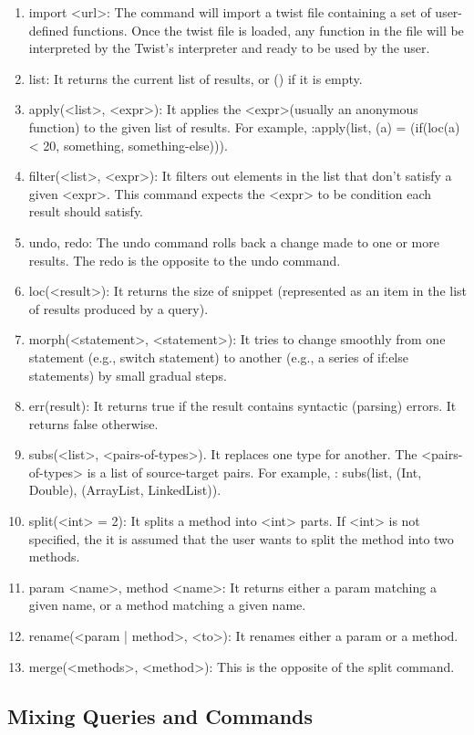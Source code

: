 \begin{enumerate}
	\item import <url>: The command will import a twist file containing a set of 
	user-defined functions. Once the twist file is loaded, any function in the file will 
	be interpreted by the Twist's interpreter and ready to be used by the user.
	\item list: It returns the current list of results, or () if it is empty.
	\item apply(<list>, <expr>): It applies the <expr>(usually an anonymous function) 
	to the given list of results. For example, :apply(list, (a) = (if(loc(a) < 20, 
	something, something-else))).
	\item filter(<list>, <expr>): It filters out elements in the list that don't satisfy 
	a given <expr>. This command expects the <expr> to be condition each result should 
	satisfy.
	\item undo, redo: The undo command rolls back a change made to one or more results. 
	The redo is the opposite to the undo command.  
	\item loc(<result>): It returns the size of snippet (represented as an item in the 
	list of results produced by a query).
	\item morph(<statement>, <statement>): It tries to change smoothly from one statement 
	(e.g., switch statement) to another (e.g., a series of if:else statements) by small gradual 
	steps.
	\item err(result): It returns true if the result contains syntactic (parsing) errors. 
	It returns false otherwise.
	\item subs(<list>, <pairs-of-types>). It replaces one type for another. The 
	<pairs-of-types> is a list of source-target pairs. For example, : subs(list, (Int, 
	Double), (ArrayList, LinkedList)).
	\item split(<int> = 2): It splits a method into <int> parts. If <int> is not 
	specified, the it is assumed that the user wants to split the method into two methods.
	\item param <name>, method <name>: It returns either a param matching a given name, 
	or a method matching a given name.
	\item rename(<param | method>, <to>): It renames either a param or a method.
   \item merge(<methods>, <method>): This is the opposite of the split command.
\end{enumerate}

\subsection{Mixing Queries and Commands}
\label{sec:queriescommands}

